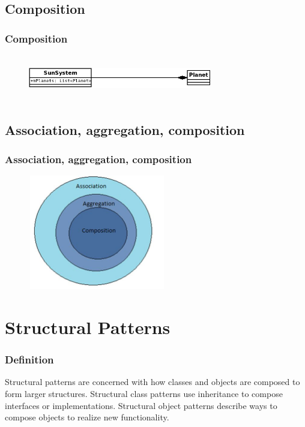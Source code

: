 \documentclass[10pt,xcolor={usenames,dvipsnames}]{beamer}
\begin{document}
\subsection{Composition}
\begin{frame}[fragile]
	\frametitle{Composition}
		\begin{figure}
			\includegraphics[height=2cm,width=8cm]{composition.png}
		\end{figure}
\end{frame}

\subsection{Association, aggregation, composition}
\begin{frame}[fragile]
	\frametitle{Association, aggregation, composition}
		\begin{figure}
			\includegraphics[height=5cm,width=6cm]{aac.jpg}
		\end{figure}
\end{frame}

\section{Structural Patterns}
\begin{frame}[fragile]
	\frametitle{Definition}
	\begin{exampleblock}{}
	Structural patterns are concerned with how classes and objects are composed to form
	larger structures. Structural class patterns use inheritance to compose interfaces or
	implementations. Structural object patterns describe ways to compose objects to
	realize new functionality.
	\end{exampleblock}
\end{frame}
\end{document}
